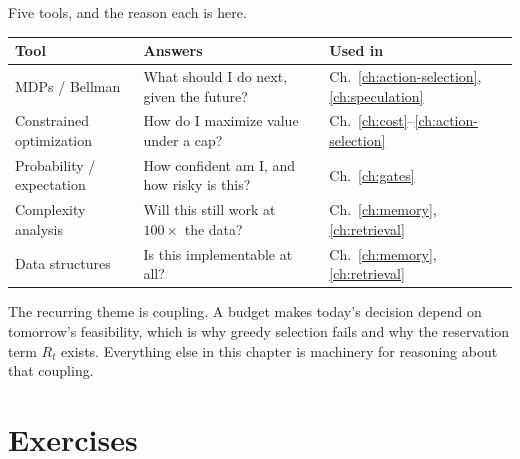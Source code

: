 Five tools, and the reason each is here.

\begin{center}
\begin{tabular}{lll}
\toprule
Tool & Answers & Used in \\
\midrule
MDPs / Bellman & What should I do next, given the future? & Ch.~\ref{ch:action-selection}, \ref{ch:speculation} \\
Constrained optimization & How do I maximize value under a cap? & Ch.~\ref{ch:cost}--\ref{ch:action-selection} \\
Probability / expectation & How confident am I, and how risky is this? & Ch.~\ref{ch:gates} \\
Complexity analysis & Will this still work at $100\times$ the data? & Ch.~\ref{ch:memory}, \ref{ch:retrieval} \\
Data structures & Is this implementable at all? & Ch.~\ref{ch:memory}, \ref{ch:retrieval} \\
\bottomrule
\end{tabular}
\end{center}

The recurring theme is coupling. A budget makes today's decision depend on
tomorrow's feasibility, which is why greedy selection fails and why the
reservation term $R_t$ exists. Everything else in this chapter is machinery for
reasoning about that coupling.

\section*{Exercises}

